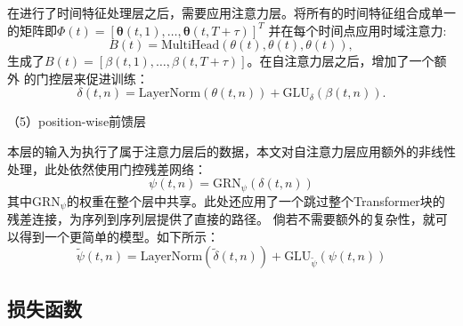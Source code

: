 在进行了时间特征处理层之后，需要应用注意力层。将所有的时间特征组合成单一的矩阵即$\bm{\varPhi }(t) = \left[ \bm{\theta} (t, 1), \ldots, \bm{\theta }(t, T+\tau) \right]^T$
并在每个时间点应用时域注意力:
\begin{equation}
    {B}(t) = \text{MultiHead}({\theta }(t), {\theta }(t), {\theta }(t)),
\end{equation}
生成了${B}(t) = \left[ {\beta }(t, 1), \ldots, {\beta }(t, T+\tau) \right]$。在自注意力层之后，增加了一个额外
的门控层来促进训练：
\begin{equation}
    {\delta}(t, n) = \text{LayerNorm}({\theta }(t, n)) + \text{GLU}_{{\delta}}({\beta}(t, n)).
\end{equation}

（5）position-wise前馈层

本层的输入为执行了属于注意力层后的数据，本文对自注意力层应用额外的非线性处理，此处依然使用门控残差网络：
\begin{equation}
    {\psi}(t, n) = \text{GRN}_{{\psi}}({\delta}(t, n))
\end{equation}
其中$ \text{GRN}_{{\psi}}$的权重在整个层中共享。此处还应用了一个跳过整个Transformer块的残差连接，为序列到序列层提供了直接的路径。
倘若不需要额外的复杂性，就可以得到一个更简单的模型。如下所示：
\begin{equation}
    \tilde{{\psi}}(t, n) = \text{LayerNorm}(\tilde{{\delta}}(t, n)) + \text{GLU}_{\tilde{{\psi}}}({{\psi}}(t, n))
\end{equation}

\subsection{损失函数}

